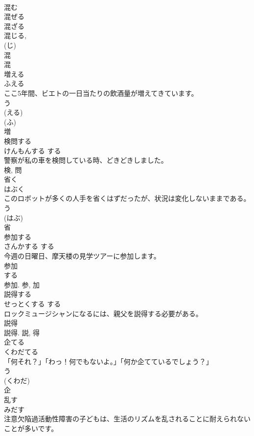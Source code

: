 \documentclass[8pt]{extreport}
\begin{document}
\begin{CJK}{UTF8}{min}
\\	混む 
\\	混ぜる 
\\	混ざる 
\\	混じる, 
\\	(じ) 
\\	混 
\\	混	
\\	増える	
\\	ふえる	
\\	ここ5年間、ビエトの一日当たりの飲酒量が増えてきています。	
\\	う 
\\	(える) 
\\	(ふ) 
\\	増	
\\	検問する	
\\	けんもんする	する 
\\	警察が私の車を検問している時、どきどきしました。	
\\	検, 問	
\\	省く	
\\	はぶく	
\\	このロボットが多くの人手を省くはずだったが、状況は変化しないままである。	
\\	う 
\\	(はぶ) 
\\	省	
\\	参加する	
\\	さんかする	する 
\\	今週の日曜日、摩天楼の見学ツアーに参加します。	
\\	参加 
\\	する 
\\	参加.	参, 加	
\\	説得する	
\\	せっとくする	する 
\\	ロックミュージシャンになるには、親父を説得する必要がある。	
\\	説得 
\\	説得.	説, 得	
\\	企てる	
\\	くわだてる	
\\	「何それ？」「わっ！何でもないよ。」「何か企てているでしょう？」	
\\	う 
\\	(くわだ) 
\\	企	
\\	乱す	
\\	みだす	
\\	注意欠陥過活動性障害の子どもは、生活のリズムを乱されることに耐えられないことが多いです。	

\end{CJK}
\end{document}
